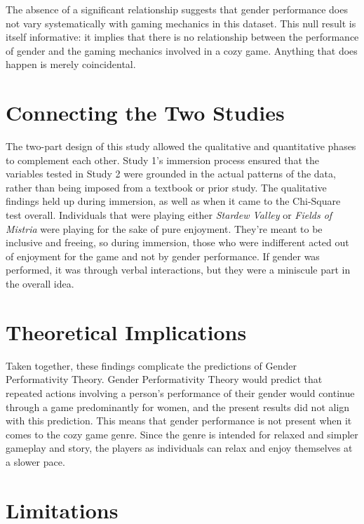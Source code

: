 \documentclass[
  12pt,
  letterpaper,
  DIV=11,
  numbers=noendperiod]{scrreprt}
\begin{document}
The absence of a significant relationship suggests that gender
performance does not vary systematically with gaming mechanics in this
dataset. This null result is itself informative: it implies that there
is no relationship between the performance of gender and the gaming
mechanics involved in a cozy game. Anything that does happen is merely
coincidental.

\section{Connecting the Two Studies}\label{connecting-the-two-studies}

The two-part design of this study allowed the qualitative and
quantitative phases to complement each other. Study 1's immersion
process ensured that the variables tested in Study 2 were grounded in
the actual patterns of the data, rather than being imposed from a
textbook or prior study. The qualitative findings held up during
immersion, as well as when it came to the Chi-Square test overall.
Individuals that were playing either \emph{Stardew Valley} or
\emph{Fields of Mistria} were playing for the sake of pure enjoyment.
They're meant to be inclusive and freeing, so during immersion, those
who were indifferent acted out of enjoyment for the game and not by
gender performance. If gender was performed, it was through verbal
interactions, but they were a miniscule part in the overall idea.

\section{Theoretical Implications}\label{theoretical-implications}

Taken together, these findings complicate the predictions of Gender
Performativity Theory. Gender Performativity Theory would predict that
repeated actions involving a person's performance of their gender would
continue through a game predominantly for women, and the present results
did not align with this prediction. This means that gender performance
is not present when it comes to the cozy game genre. Since the genre is
intended for relaxed and simpler gameplay and story, the players as
individuals can relax and enjoy themselves at a slower pace.

\section{Limitations}\label{limitations}
\end{document}
